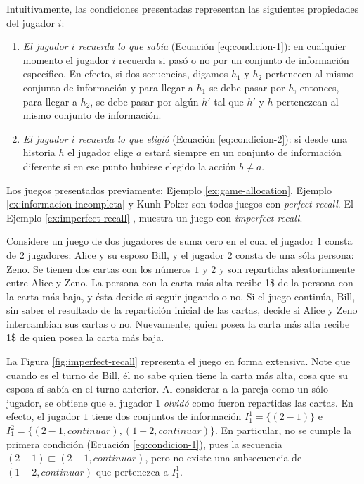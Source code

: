 Intuitivamente, las condiciones presentadas representan las siguientes propiedades del jugador $i$:
\begin{enumerate}[noitemsep]
\item \textit{El jugador $i$ recuerda lo que sabía} (Ecuación \ref{eq:condicion-1}): en cualquier momento el jugador $i$ recuerda si pasó o no por un conjunto de información específico. En efecto, si dos secuencias, digamos $h_1$ y $h_2$ pertenecen al mismo conjunto de información y para llegar a $h_1$ se debe pasar por $h$, entonces, para llegar a $h_2$, se debe pasar por algún $h'$ tal que $h'$ y $h$ pertenezcan al mismo conjunto de información. 

\item \textit{El jugador $i$ recuerda lo que eligió} (Ecuación \ref{eq:condicion-2}): si desde una historia $h$ el jugador elige $a$ estará siempre en un conjunto de información diferente si en ese punto hubiese elegido la acción $b \neq a$.
\end{enumerate}

Los juegos presentados previamente: Ejemplo \ref{ex:game-allocation}, Ejemplo \ref{ex:informacion-incompleta} y Kunh Poker son todos juegos con \textit{perfect recall}. El Ejemplo \ref{ex:imperfect-recall} \cite{bib:conceptos-basicos}, muestra un juego con \textit{imperfect recall}.

\begin{example}
\label{ex:imperfect-recall}
Considere un juego de dos jugadores de suma cero en el cual el jugador $1$ consta de $2$ jugadores: Alice y su esposo Bill, y el jugador $2$ consta de una sóla persona: Zeno. Se tienen dos cartas con los números $1$ y $2$ y son repartidas aleatoriamente entre Alice y Zeno. La persona con la carta más alta recibe 1\$ de la persona con la carta más baja, y ésta decide si seguir jugando o no. Si el juego continúa, Bill, sin saber el resultado de la repartición inicial de las cartas, decide si Alice y Zeno intercambian sus cartas o no. Nuevamente, quien posea la carta más alta recibe 1\$ de quien posea la carta más baja.
\end{example}

 La Figura \ref{fig:imperfect-recall} representa el juego en forma extensiva. Note que cuando es el turno de Bill, él no sabe quien tiene la carta más alta, cosa que su esposa sí sabía en el turno anterior.  Al considerar a la pareja como un sólo jugador, se obtiene que el jugador $1$ \textit{olvidó} como fueron repartidas las cartas. En efecto, el jugador $1$ tiene dos conjuntos de información $I^1_1 = \{(2-1) \}$ e $I^2_1 = \{(2-1, continuar), (1-2, continuar) \}$. En particular, no se cumple la primera condición (Ecuación \ref{eq:condicion-1}), pues la secuencia $(2-1) \sqsubset (2-1, continuar)$, pero no existe una subsecuencia de $(1-2, continuar)$ que pertenezca a $I^1_1$.

